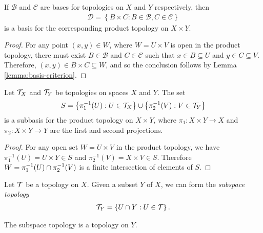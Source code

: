 \begin{thm}
    If $\mathcal{B}$ and $\mathcal{C}$ are bases for topologies on $X$ and $Y$ respectively, then
    \begin{align*}
        \mathcal{D} = \left\{B \times C : B \in \mathcal{B}, C \in \mathcal{C}\right\}
    \end{align*}
    is a basis for the corresponding product topology on $X \times Y$.
\end{thm}

\begin{proof}
    For any point $(x, y) \in W$, where $W = U \times V$ is open in the product topology, there must exist $B \in \mathcal{B}$ and $C \in \mathcal{C}$ such that $x \in B \subseteq U$ and $y \in C \subseteq V$. Therefore, $(x, y) \in B \times C \subseteq W$, and so the conclusion follows by Lemma \ref{lemma:basis-criterion}.
\end{proof}

\begin{thm}
    Let $\mathcal{T}_X$ and $\mathcal{T}_Y$ be topologies on spaces $X$ and $Y$. The set
    \begin{align*}
        S = \left\{\pi_1^{-1}(U) : U \in \mathcal{T}_X\right\} \cup \left\{\pi_2^{-1}(V) : V \in \mathcal{T}_Y\right\}
    \end{align*}
    is a subbasis for the product topology on $X \times Y$, where $\pi_1: X \times Y \to X$ and $\pi_2: X \times Y \to Y$ are the first and second projections.
\end{thm}

\begin{proof}
    For any open set $W = U \times V$ in the product topology, we have $\pi_1^{-1}(U) = U \times Y \in S$ and $\pi_2^{-1}(V) = X \times V \in S$. Therefore $W = \pi_1^{-1}(U) \cap \pi_2^{-1}(V)$ is a finite intersection of elements of $S$.
\end{proof}

\begin{defn}
    Let $\mathcal{T}$ be a topology on $X$. Given a subset $Y$ of $X$, we can form the \emph{subspace topology}
    \begin{align*}
        \mathcal{T}_Y = \left\{U \cap Y : U \in \mathcal{T}\right\}.
    \end{align*}
\end{defn}

\begin{prop}
    The subspace topology is a topology on $Y$.
\end{prop}

